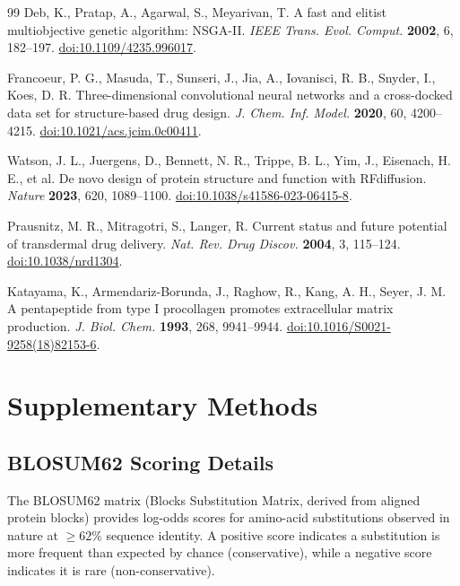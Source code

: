 \documentclass[11pt,letterpaper]{article}
\begin{document}
\begin{thebibliography}{99}
 Deb, K., Pratap, A., Agarwal, S., Meyarivan, T. A fast and elitist multiobjective genetic algorithm: NSGA-II. \textit{IEEE Trans. Evol. Comput.} \textbf{2002}, 6, 182--197. \href{https://doi.org/10.1109/4235.996017}{doi:10.1109/4235.996017}.

 Francoeur, P. G., Masuda, T., Sunseri, J., Jia, A., Iovanisci, R. B., Snyder, I., Koes, D. R. Three-dimensional convolutional neural networks and a cross-docked data set for structure-based drug design. \textit{J. Chem. Inf. Model.} \textbf{2020}, 60, 4200--4215. \href{https://doi.org/10.1021/acs.jcim.0c00411}{doi:10.1021/acs.jcim.0c00411}.

 Watson, J. L., Juergens, D., Bennett, N. R., Trippe, B. L., Yim, J., Eisenach, H. E., et al. De novo design of protein structure and function with RFdiffusion. \textit{Nature} \textbf{2023}, 620, 1089--1100. \href{https://doi.org/10.1038/s41586-023-06415-8}{doi:10.1038/s41586-023-06415-8}.

 Prausnitz, M. R., Mitragotri, S., Langer, R. Current status and future potential of transdermal drug delivery. \textit{Nat. Rev. Drug Discov.} \textbf{2004}, 3, 115--124. \href{https://doi.org/10.1038/nrd1304}{doi:10.1038/nrd1304}.

 Katayama, K., Armendariz-Borunda, J., Raghow, R., Kang, A. H., Seyer, J. M. A pentapeptide from type I procollagen promotes extracellular matrix production. \textit{J. Biol. Chem.} \textbf{1993}, 268, 9941--9944. \href{https://doi.org/10.1016/S0021-9258(18)82153-6}{doi:10.1016/S0021-9258(18)82153-6}.

\end{thebibliography}

\appendix

\section{Supplementary Methods}

\subsection{BLOSUM62 Scoring Details}

The BLOSUM62 matrix (Blocks Substitution Matrix, derived from aligned protein blocks) provides log-odds scores for amino-acid substitutions observed in nature at $\geq 62\%$ sequence identity. A positive score indicates a substitution is more frequent than expected by chance (conservative), while a negative score indicates it is rare (non-conservative).
\end{document}
